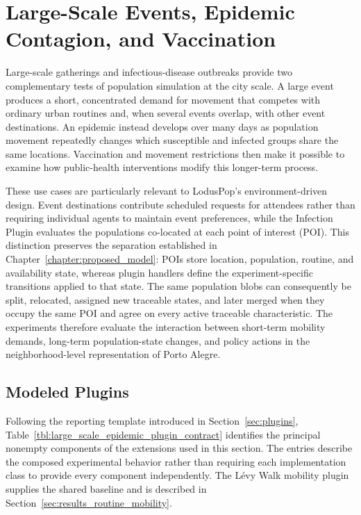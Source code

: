 \section{Large-Scale Events, Epidemic Contagion, and Vaccination}
\label{sec:results_large_scale_events_epidemics}

Large-scale gatherings and infectious-disease outbreaks provide two complementary tests of population simulation at the city scale. A large event produces a short, concentrated demand for movement that competes with ordinary urban routines and, when several events overlap, with other event destinations. An epidemic instead develops over many days as population movement repeatedly changes which susceptible and infected groups share the same locations. Vaccination and movement restrictions then make it possible to examine how public-health interventions modify this longer-term process.

These use cases are particularly relevant to LodusPop's environment-driven design. Event destinations contribute scheduled requests for attendees rather than requiring individual agents to maintain event preferences, while the Infection Plugin evaluates the populations co-located at each point of interest (POI). This distinction preserves the separation established in 
Chapter~\ref{chapter:proposed_model}: POIs store location, population, routine, and availability state, whereas plugin handlers define the experiment-specific transitions applied to that state. The same population blobs can consequently be split, relocated, assigned new traceable states, and later merged when they occupy the same POI and agree on every active traceable characteristic. The experiments therefore evaluate the interaction between short-term mobility demands, long-term population-state changes, and policy actions in the neighborhood-level representation of Porto Alegre.


\subsection{Modeled Plugins}
\label{sec:large_scale_epidemic_plugins}

Following the reporting template introduced in Section~\ref{sec:plugins}, Table~\ref{tbl:large_scale_epidemic_plugin_contract} identifies the principal nonempty components of the extensions used in this section. The entries describe the composed experimental behavior rather than requiring each implementation class to provide every component independently. The L\'evy Walk mobility plugin supplies the shared baseline and is described in Section~\ref{sec:results_routine_mobility}.

